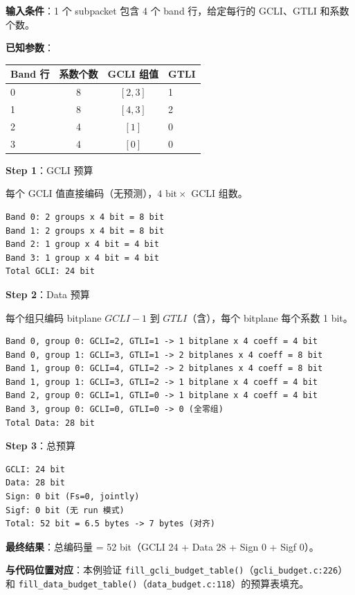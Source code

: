 \begin{examplebox}[title={例 4：预算表计算}]

\textbf{输入条件}：1 个 subpacket 包含 4 个 band 行，给定每行的 GCLI、GTLI 和系数个数。

\medskip
\textbf{已知参数}：

\begin{tabular}{@{}lccl@{}}
\toprule
Band 行 & 系数个数 & GCLI 组值 & GTLI \\
\midrule
0 & 8 & $[2, 3]$ & 1 \\
1 & 8 & $[4, 3]$ & 2 \\
2 & 4 & $[1]$ & 0 \\
3 & 4 & $[0]$ & 0 \\
\bottomrule
\end{tabular}

\medskip
\textbf{Step 1}：GCLI 预算

每个 GCLI 值直接编码（无预测），$4 \text{ bit} \times$ GCLI 组数。

\begin{lstlisting}[numbers=none]
Band 0: 2 groups x 4 bit = 8 bit
Band 1: 2 groups x 4 bit = 8 bit
Band 2: 1 group x 4 bit = 4 bit
Band 3: 1 group x 4 bit = 4 bit
Total GCLI: 24 bit
\end{lstlisting}

\textbf{Step 2}：Data 预算

每个组只编码 bitplane $\mathit{GCLI} - 1$ 到 $\mathit{GTLI}$（含），每个 bitplane 每个系数 1 bit。

\begin{lstlisting}[numbers=none]
Band 0, group 0: GCLI=2, GTLI=1 -> 1 bitplane x 4 coeff = 4 bit
Band 0, group 1: GCLI=3, GTLI=1 -> 2 bitplanes x 4 coeff = 8 bit
Band 1, group 0: GCLI=4, GTLI=2 -> 2 bitplanes x 4 coeff = 8 bit
Band 1, group 1: GCLI=3, GTLI=2 -> 1 bitplane x 4 coeff = 4 bit
Band 2, group 0: GCLI=1, GTLI=0 -> 1 bitplane x 4 coeff = 4 bit
Band 3, group 0: GCLI=0, GTLI=0 -> 0 (全零组)
Total Data: 28 bit
\end{lstlisting}

\textbf{Step 3}：总预算

\begin{lstlisting}[numbers=none]
GCLI: 24 bit
Data: 28 bit
Sign: 0 bit (Fs=0, jointly)
Sigf: 0 bit (无 run 模式)
Total: 52 bit = 6.5 bytes -> 7 bytes (对齐)
\end{lstlisting}

\medskip
\textbf{最终结果}：总编码量 = 52 bit（GCLI 24 + Data 28 + Sign 0 + Sigf 0）。

\medskip
\textbf{与代码位置对应}：本例验证 \texttt{fill\_gcli\_budget\_table()}（\texttt{gcli\_budget.c:226}）和 \texttt{fill\_data\_budget\_table()}（\texttt{data\_budget.c:118}）的预算表填充。
\end{examplebox}

